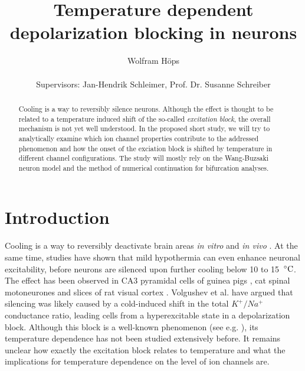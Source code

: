 \documentclass[11pt]{article}
\title{Temperature dependent depolarization blocking in neurons}
\author{Wolfram H\"ops \\ \\Supervisors:  Jan-Hendrik Schleimer, Prof. Dr. Susanne Schreiber}
\begin{document}

\singlespace
\maketitle

\begin{abstract}                %

Cooling is a way to reversibly silence neurons. Although the effect is thought to be related to a temperature induced shift of the so-called \textit{excitation block}, the overall mechanism is not yet well understood. In the proposed short study, we will try to analytically examine which ion channel properties contribute to the addressed phenomenon and how the onset of the exciation block is shifted by temperature in different channel configurations. The study will mostly rely on the Wang-Buzsaki neuron model and the method of numerical continuation for bifurcation analyses.  
\end{abstract}


\doublespace
\setcounter{secnumdepth}{2}

\section{Introduction}\label{ch:overview}

Cooling is a way to reversibly deactivate brain areas \textit{in vitro} and \textit{in vivo} \cite{Lomber1999}. At the same time, studies have shown that mild hypothermia can even enhance neuronal excitability, before neurons are silenced upon further cooling below 10 to 15 $\,^{\circ}{\rm C}$. The effect has been observed in CA3 pyramidal cells of guinea pigs \cite{Aihara2001}, cat spinal motoneurones \cite{Klee1974, Michalski1993a} and slices of rat visual cortex \cite{Volgushev2000}. Volgushev et al. \cite{Volgushev2000} have argued that silencing was likely caused by a cold-induced shift in the total $K^{+}/Na^{+}$ conductance ratio, leading cells from a hyperexcitable state in a depolarization block. Although this block is a well-known phenomenon (see e.g. \cite{Bianchi2012}), its temperature dependence has not been studied extensively before. It remains unclear how exactly the excitation block relates to temperature and what the implications for temperature dependence on the level of ion channels are. 
\end{document}
